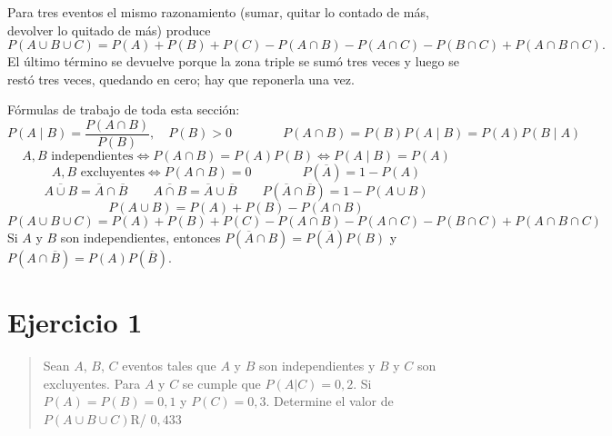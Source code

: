 \documentclass[11pt]{article}
\begin{document}
\begin{teo}
Para tres eventos el mismo razonamiento (sumar, quitar lo contado de más, devolver lo quitado de más) produce
\[
P(A\cup B\cup C)=P(A)+P(B)+P(C)-P(A\cap B)-P(A\cap C)-P(B\cap C)+P(A\cap B\cap C).
\]
El último término se devuelve porque la zona triple se sumó tres veces y luego se restó tres veces, quedando en cero; hay que reponerla una vez.
\end{teo}

\begin{tip}
Fórmulas de trabajo de toda esta sección:
\[
P(A\mid B)=\frac{P(A\cap B)}{P(B)},\quad P(B)>0
\qquad\qquad
P(A\cap B)=P(B)P(A\mid B)=P(A)P(B\mid A)
\]
\[
A,B \text{ independientes}\iff P(A\cap B)=P(A)P(B)\iff P(A\mid B)=P(A)
\]
\[
A,B \text{ excluyentes}\iff P(A\cap B)=0
\qquad\qquad
P(\overline{A})=1-P(A)
\]
\[
\overline{A\cup B}=\overline{A}\cap\overline{B}
\qquad
\overline{A\cap B}=\overline{A}\cup\overline{B}
\qquad
P(\overline{A}\cap\overline{B})=1-P(A\cup B)
\]
\[
P(A\cup B)=P(A)+P(B)-P(A\cap B)
\]
\[
P(A\cup B\cup C)=P(A)+P(B)+P(C)-P(A\cap B)-P(A\cap C)-P(B\cap C)+P(A\cap B\cap C)
\]
Si $A$ y $B$ son independientes, entonces $P(\overline{A}\cap B)=P(\overline{A})P(B)$ y $P(A\cap\overline{B})=P(A)P(\overline{B})$.
\end{tip}

\section*{Ejercicio 1}

\begin{quote}
Sean $A$, $B$, $C$ eventos tales que $A$ y $B$ son independientes y $B$ y $C$ son excluyentes. Para $A$ y $C$ se cumple que $P(A|C) = 0{,}2$. Si $P(A) = P(B) = 0{,}1$ y $P(C) = 0{,}3$. Determine el valor de $P(A \cup B \cup C)$\hfill R/ $0{,}433$
\end{quote}
\end{document}
